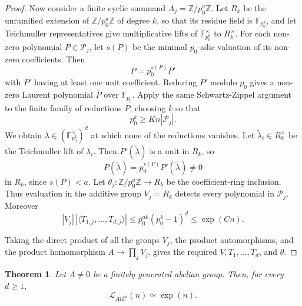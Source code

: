 \documentclass[11pt]{article}
\newcommand{\LEF}{\mathcal L}
\newcommand{\Z}{\mathbb Z}
\newcommand{\F}{\mathbb F}
\newtheorem{theorem}{Theorem}[section]
\begin{document}
\begin{proof}
Now consider a finite cyclic summand \(A_j=\Z/p_0^a\Z\). Let \(R_k\) be the unramified extension of \(\Z/p_0^a\Z\) of degree \(k\), so that its residue field is \(\F_{p_0^k}\), and let Teichmuller representatives give multiplicative lifts of \(\F_{p_0^k}^\times\) to \(R_k^\times\). For each non-zero polynomial \(P\in\mathcal P_j\), let \(s(P)\) be the minimal \(p_0\)-adic valuation of its non-zero coefficients. Then
\[
P=p_0^{s(P)}P'
\]
with \(P'\) having at least one unit coefficient. Reducing \(P'\) modulo \(p_0\) gives a non-zero Laurent polynomial \(\overline P\) over \(\F_{p_0}\). Apply the same Schwartz-Zippel argument to the finite family of reductions \(\overline P\), choosing \(k\) so that
\[
p_0^k\ge Kn|\mathcal P_j|.
\]
We obtain \(\lambda\in(\F_{p_0^k}^\times)^d\) at which none of the reductions vanishes. Let \(\tilde\lambda_i\in R_k^\times\) be the Teichmuller lift of \(\lambda_i\). Then \(P'(\tilde\lambda)\) is a unit in \(R_k\), so
\[
P(\tilde\lambda)=p_0^{s(P)}P'(\tilde\lambda)\neq 0
\]
in \(R_k\), since \(s(P)<a\). Let \(\theta_j:\Z/p_0^a\Z\to R_k\) be the coefficient-ring inclusion. Thus evaluation in the additive group \(V_j=R_k\) detects every polynomial in \(\mathcal P_j\). Moreover
\[
|V_j|\,|\langle T_{1,j},\ldots,T_{d,j}\rangle|\le p_0^{ak}(p_0^k-1)^d\le \exp(Cn).
\]

Taking the direct product of all the groups \(V_j\), the product automorphisms, and the product homomorphism \(A\to\prod_j V_j\), gives the required \(V,T_1,\ldots,T_d\), and \(\theta\).
\end{proof}

\begin{theorem}
Let \(A\neq 0\) be a finitely generated abelian group. Then, for every \(d\ge 1\),
\[
\LEF_{A\wr\Z^d}(n)\simeq \exp(n).
\]
\end{theorem}
\end{document}
